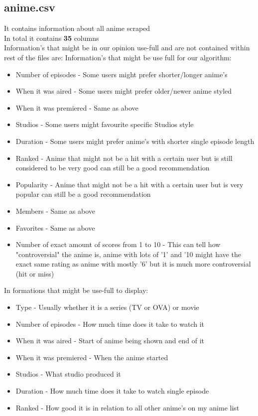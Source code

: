 \documentclass[12pt]{article}
\begin{document}
\subsection{anime.csv}
It contains information about all anime scraped \\ 
In total it contains \textbf{35} columns \\ 
Information's that might be in our opinion use-full and are not contained within rest of the files are:
Information's that might be use full for our algorithm:
\begin{itemize}
\item Number of episodes - Some users might prefer shorter/longer anime's
\item When it was aired - Some users might prefer older/newer anime styled
\item When it was premiered - Same as above
\item Studios - Some users might favourite specific Studios style
\item Duration  - Some users might prefer anime's with shorter single episode length
\item Ranked - Anime that might not be a hit with a certain user but is still considered to be very good can still be a good recommendation
\item Popularity - Anime that might not be a hit with a certain user but is very popular can still be a good recommendation
\item Members - Same as above
\item Favorites - Same as above
\item Number of exact amount of scores from 1 to 10 - This can tell how "controversial" the anime is, anime with lots of '1' and '10 might have the exact same rating as anime with mostly '6' but it is much more controversial (hit or miss)
\end{itemize}

In formations that might be use-full to display:
\begin{itemize}
\item Type - Usually whether it is a series (TV or OVA) or movie
\item Number of episodes - How much time does it take to watch it
\item When it was aired - Start of anime being shown and end of it
\item When it was premiered - When the anime started
\item Studios - What studio produced it
\item Duration - How much time does it take to watch single episode
\item Ranked - How good it is in relation to all other anime's on my anime list
\end{itemize}
\end{document}
